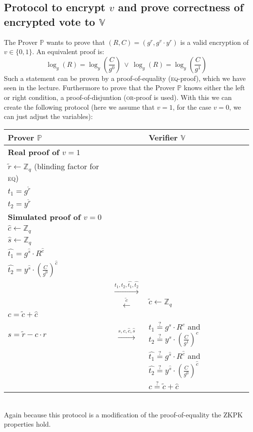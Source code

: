 \documentclass{report}
\begin{document}
		\subsection{Protocol to encrypt $v$ and prove correctness of encrypted vote to $\mathbb{V}$}
		\startsection
			The Prover $\mathbb{P}$ wants to prove that $(R,C) = (g^r , g^v \cdot y^r)$ is a valid encryption of $v \in \{0, 1\}$. An equivalent proof is:
			\[
				\log_g (R) = \log_y(\frac{C}{g^0}) \ \vee \ \log_g (R) = \log_y(\frac{C}{g^1})
			\]
			Such a statement can be proven by a proof-of-equality (\textsc{eq}-proof), which we have seen in the lecture. Furthermore to prove that the Prover $\mathbb{P}$ knows either the left or right condition, a proof-of-disjuntion (\textsc{or}-proof is used). With this we can create the following protocol (here we assume that $v = 1$, for the case $v = 0$, we can just adjust the variables):
			\begin{center}
				\begin{tabular}{|lcl|}
					\hline
					\textbf{Prover $\mathbb{P}$} & & \textbf{Verifier $\mathbb{V}$} \\
					\hline
					\textbf{Real proof of $v = 1$} && \\
					$\tilde{r} \leftarrow \mathbb{Z}_q$ (blinding factor for \textsc{eq}) && \\
					$t_1 = g^{\tilde{r}}$ && \\
					$t_2 = y^{\tilde{r}}$ && \\
					\textbf{Simulated proof of $v = 0$} && \\
					$\hat{c} \leftarrow \mathbb{Z}_q$ && \\
					$\hat{s} \leftarrow \mathbb{Z}_q$ && \\
					$\hat{t_1} = g^{\hat{s}} \cdot R^{\hat{c}}$ && \\
					$\hat{t_2} = y^{\hat{s}} \cdot (\frac{C}{g^0})^{\hat{c}}$ && \\
					& $\stackrel{t_1, t_2, \hat{t_1}, \hat{t_2}}{\rightarrow}$ & \\
					& $\stackrel{\tilde{c}}{\leftarrow}$ & $\tilde{c} \leftarrow \mathbb{Z}_q$ \\
					$c = \tilde{c} + \hat{c}$ && \\
					$s = \tilde{r} - c \cdot r$ & $\stackrel{s,c,\hat{c}, \hat{s}}{\rightarrow}$ & $t_1 \stackrel{?}{=} g^s \cdot R^c$ and $t_2 \stackrel{?}{=} y^s \cdot (\frac{C}{g^1})^c$ \\
					&& $\hat{t_1} \stackrel{?}{=} g^{\hat{s}} \cdot R^{\hat{c}}$ and $\hat{t_2} \stackrel{?}{=} y^{\hat{s}} \cdot (\frac{C}{g^0})^{\hat{c}}$ \\
					&& $c \stackrel{?}{=} \tilde{c} + \hat{c}$ \\
					\hline
				\end{tabular}
			\end{center}
			\hfill \\
			Again because this protocol is a modification of the proof-of-equality the ZKPK properties hold.
		\closesection
	\closesection
\end{document}
